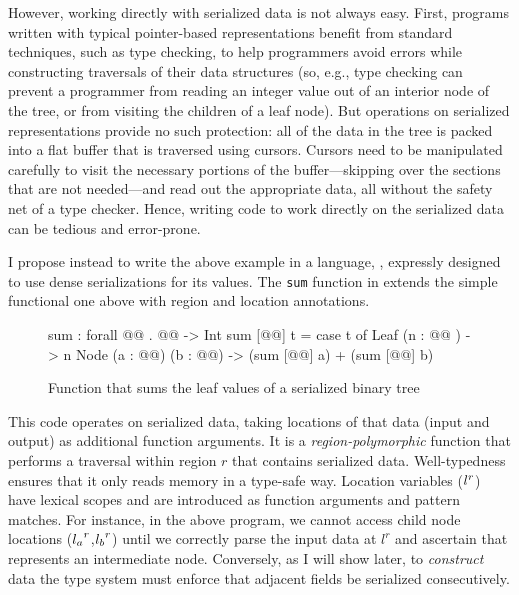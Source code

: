 \documentclass[showabstract,showacknowledgments,showpreface,showdedication]{iuphd}
\theoremstyle{nonumberplain}
\newcommand{\il}[1]{\lstinline[style=inline,mathescape=true];#1;}
\begin{document}
However, working directly with serialized data is not always easy. First,
programs written with typical pointer-based representations benefit from
standard techniques, such as type checking, to help programmers avoid errors
while constructing traversals of their data structures (so, e.g., type
checking can prevent a programmer from reading an integer value out of an
interior node of the tree, or from visiting the children of a leaf node). But
operations on serialized representations provide no such protection: all of the
data in the tree is packed into a flat buffer that is traversed using cursors.
Cursors need to be manipulated carefully to visit
the necessary portions of the buffer---skipping over the sections that are not
needed---and read out the appropriate data, all without the safety net of a
type checker. Hence, writing code to work directly on the serialized data can
be tedious and error-prone.

I propose instead to write the above example in a language, \emph{\ourcalc},
expressly designed to use dense serializations for its values. The \ourcalc
\il{sum} function in  extends the simple functional
one above with region and location annotations.

\begin{figure}
\begin{code}
sum : forall @@ . @@ -> Int
sum [@@] t = case t of
              Leaf (n : @@ ) -> n
              Node (a : @@) (b : @@)
               -> (sum [@@] a) + (sum [@@] b)
\end{code}
\caption{Function that sums the leaf values of a serialized binary tree}
\label{fig:gibbon_sumtree}
\end{figure}

This code operates on serialized data, taking locations of that data (input and
output) as additional function arguments.  It is a {\em region-polymorphic}
function that performs a traversal within region $r$ that contains serialized
data.  Well-typedness ensures that it only reads memory in a type-safe way.
%
Location variables (${l}^{r}$) have lexical scopes and are introduced as
function arguments and pattern matches.
%
For instance, in the above program, we cannot
access child node locations (${l_a}^{r}$,${l_b}^{r}$) until we correctly parse the input
data at $l^r$ and ascertain that represents an intermediate node.
%
Conversely, as I will show later, to \emph{construct} data the type system must
enforce that adjacent fields be serialized consecutively.
\end{document}
